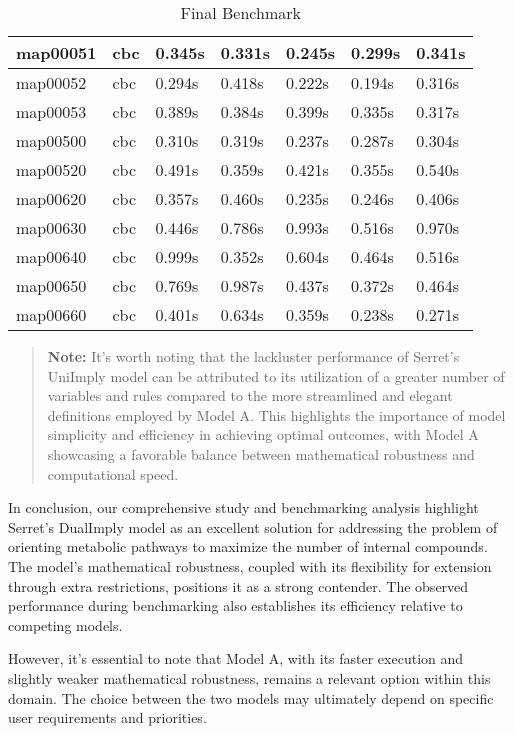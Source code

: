 \begin{table}[H]
\begin{tabular}{|l|l|l|l|l|l|l|}
map00051 & cbc & 0.345s         & 0.331s                & 0.245s               & 0.299s       & 0.341s      \\\hline
map00052 & cbc & 0.294s          & 0.418s               & 0.222s               & 0.194s      & 0.316s       \\\hline
map00053 & cbc & 0.389s         & 0.384s               & 0.399s              & 0.335s      & 0.317s       \\\hline
map00500 & cbc & 0.310s          & 0.319s               & 0.237s              & 0.287s      & 0.304s      \\\hline
map00520 & cbc & 0.491s          & 0.359s                & 0.421s               & 0.355s       & 0.540s       \\\hline
map00620 & cbc & 0.357s           & 0.460s               & 0.235s              & 0.246s      & 0.406s       \\\hline
map00630 & cbc & 0.446s          & 0.786s                & 0.993s                 & 0.516s        & 0.970s       \\\hline
map00640 & cbc & 0.999s          & 0.352s                & 0.604s               & 0.464s       & 0.516s       \\\hline
map00650 & cbc & 0.769s          & 0.987s                & 0.437s                & 0.372s       & 0.464s       \\\hline
map00660 & cbc & 0.401s          & 0.634s                 & 0.359s              & 0.238s      & 0.271s     \\\hline
\end{tabular}
\caption{Final Benchmark}
\label{tab:final_benchmark}
\end{table}

\begin{quote}
    \textbf{Note:} It's worth noting that the lackluster performance of Serret's UniImply model can be attributed to its utilization of a greater number of variables and rules compared to the more streamlined and elegant definitions employed by Model A. This highlights the importance of model simplicity and efficiency in achieving optimal outcomes, with Model A showcasing a favorable balance between mathematical robustness and computational speed.
\end{quote}

In conclusion, our comprehensive study and benchmarking analysis highlight Serret's DualImply model as an excellent solution for addressing the problem of orienting metabolic pathways to maximize the number of internal compounds. The model's mathematical robustness, coupled with its flexibility for extension through extra restrictions, positions it as a strong contender. The observed performance during benchmarking also establishes its efficiency relative to competing models.

However, it's essential to note that Model A, with its faster execution and slightly weaker mathematical robustness, remains a relevant option within this domain. The choice between the two models may ultimately depend on specific user requirements and priorities.



